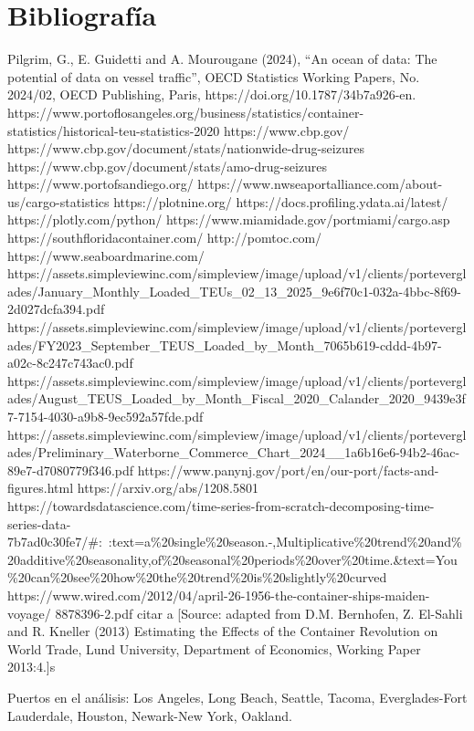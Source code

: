 \documentclass[12pt]{article}
\begin{document}
\section{Bibliografía}
Pilgrim, G., E. Guidetti and A. Mourougane (2024), “An ocean of data: The potential of data on vessel traffic”, OECD Statistics Working Papers, No. 2024/02, OECD Publishing, Paris, https://doi.org/10.1787/34b7a926-en. 
https://www.portoflosangeles.org/business/statistics/container-statistics/historical-teu-statistics-2020
https://www.cbp.gov/
https://www.cbp.gov/document/stats/nationwide-drug-seizures
https://www.cbp.gov/document/stats/amo-drug-seizures
https://www.portofsandiego.org/
https://www.nwseaportalliance.com/about-us/cargo-statistics
https://plotnine.org/
https://docs.profiling.ydata.ai/latest/
https://plotly.com/python/
https://www.miamidade.gov/portmiami/cargo.asp
https://southfloridacontainer.com/
http://pomtoc.com/
https://www.seaboardmarine.com/
https://assets.simpleviewinc.com/simpleview/image/upload/v1/clients/porteverglades/January\_Monthly\_Loaded\_TEUs\_02\_13\_2025\_9e6f70c1-032a-4bbc-8f69-2d027dcfa394.pdf
https://assets.simpleviewinc.com/simpleview/image/upload/v1/clients/porteverglades/FY2023\_September\_TEUS\_Loaded\_by\_Month\_7065b619-cddd-4b97-a02c-8c247c743ac0.pdf
https://assets.simpleviewinc.com/simpleview/image/upload/v1/clients/porteverglades/August\_TEUS\_Loaded\_by\_Month\_Fiscal\_2020\_Calander\_2020\_9439e3f7-7154-4030-a9b8-9ec592a57fde.pdf
https://assets.simpleviewinc.com/simpleview/image/upload/v1/clients/porteverglades/Preliminary\_Waterborne\_Commerce\_Chart\_2024\_\_1a6b16e6-94b2-46ac-89e7-d7080779f346.pdf
https://www.panynj.gov/port/en/our-port/facts-and-figures.html
https://arxiv.org/abs/1208.5801
https://towardsdatascience.com/time-series-from-scratch-decomposing-time-series-data-7b7ad0c30fe7/\#:~:text=a\%20single\%20season.-,Multiplicative\%20trend\%20and\%20additive\%20seasonality,of\%20seasonal\%20periods\%20over\%20time.\&text=You\%20can\%20see\%20how\%20the\%20trend\%20is\%20slightly\%20curved
https://www.wired.com/2012/04/april-26-1956-the-container-ships-maiden-voyage/
8878396-2.pdf
citar a [Source: adapted from D.M. Bernhofen, Z. El-Sahli and R. Kneller (2013) Estimating the Effects of the Container Revolution on World Trade, Lund University, Department of Economics, Working Paper 2013:4.]s

Puertos en el análisis: Los Angeles, Long Beach, Seattle, Tacoma, Everglades-Fort Lauderdale, Houston, Newark-New York, Oakland.

\newpage
\end{document}
